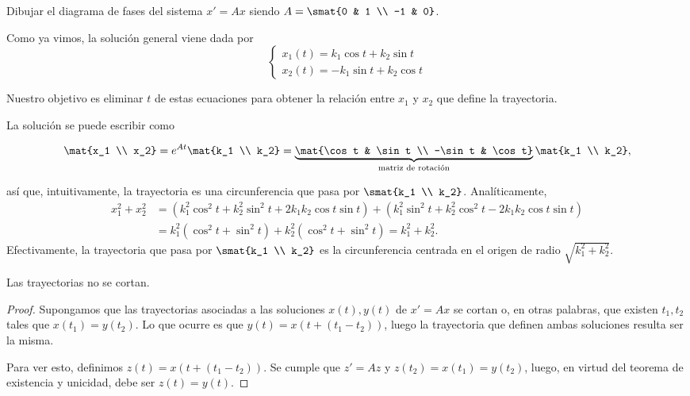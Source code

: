 \documentclass[../main.tex]{subfiles}
\begin{document}
\begin{example}
  Dibujar el diagrama de fases del sistema \(x' = Ax\) siendo
  \(A = \smat{0 & 1 \\ -1 & 0}\).

  Como ya vimos, la solución general viene dada por
  \[\begin{cases}
      x_1(t) = k_1 \cos t + k_2 \sin t \\
      x_2(t) = - k_1 \sin t + k_2 \cos t
    \end{cases}\]

  Nuestro objetivo es eliminar \(t\) de estas ecuaciones para obtener la
  relación entre \(x_1\) y \(x_2\) que define la trayectoria.

  La solución se puede escribir como

  \[\mat{x_1 \\ x_2} = e^{At}\mat{k_1 \\ k_2} =
    \underbrace{\mat{\cos t & \sin t \\ -\sin t & \cos t}}_{\text{matriz de
        rotación}} \mat{k_1 \\ k_2},\]

  así que, intuitivamente, la trayectoria es una circunferencia que pasa por
  \(\smat{k_1 \\ k_2}\). Analíticamente,
  \begin{align*}
    x_1^2 + x_2^2 &= (k_1^2\cos^2t + k_2^2\sin^2t + 2k_1k_2\cos t \sin t) +
                    (k_1^2\sin^2t + k_2^2\cos^2t - 2k_1k_2\cos t \sin t) \\
    &= k_1^2(\cos^2 t + \sin^2 t) + k_2^2(\cos^2t + \sin^2t) = k_1^2+k_2^2.
  \end{align*}
  Efectivamente, la trayectoria que pasa por \(\smat{k_1 \\ k_2}\) es la
  circunferencia centrada en el origen de radio \(\sqrt{k_1^2+k_2^2}\).
\end{example}

\begin{theorem}
  Las trayectorias no se cortan.
  \begin{proof}
    Supongamos que las trayectorias asociadas a las soluciones \(x(t), y(t)\) de
    \(x' = Ax\) se cortan o, en otras palabras, que existen \(t_1, t_2\) tales
    que \(x(t_1) = y(t_2)\). Lo que ocurre es que \(y(t) = x(t + (t_1-t_2))\),
    luego la trayectoria que definen ambas soluciones resulta ser la misma.

    Para ver esto, definimos \(z(t) = x(t + (t_1-t_2))\). Se cumple que \(z' =
    Az\) y \(z(t_2) = x(t_1) = y(t_2)\), luego, en virtud del teorema de
    existencia y unicidad, debe ser \(z(t) = y(t)\).
  \end{proof}
\end{theorem}
\end{document}
